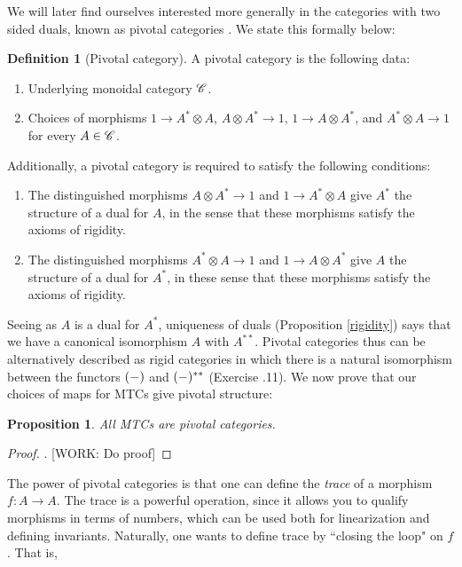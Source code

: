 \documentclass{article}
\newtheorem{proposition}{Proposition}[section]
\theoremstyle{definition}
\newtheorem*{definition}{Definition}
\numberwithin{figure}{section}
\begin{document}
We will later find ourselves interested more generally in the categories with two sided duals, known as pivotal categories \cite{selinger2011survey}. We state this formally below:

\begin{definition}[Pivotal category] A pivotal category is the following data:

\begin{enumerate}
\item Underlying monoidal category $\mathscr{C}$.
\item Choices of morphisms $1\to A^{*}\otimes A$, $A\otimes A^{*}\to 1$, $1\to A\otimes A^{*}$, and $A^{*}\otimes A\to 1$ for every $A\in \mathscr{C}$.
\end{enumerate}

Additionally, a pivotal category is required to satisfy the following conditions:

\begin{enumerate}
\item The distinguished morphisms $A\otimes A^{*}\to 1$ and $1\to A^{*}\otimes A$ give $A^{*}$ the structure of a dual for $A$, in the sense that these morphisms satisfy the axioms of rigidity.

\item The distinguished morphisms $A^{*}\otimes A\to 1$ and $1\to A\otimes A^{*}$ give $A$ the structure of a dual for $A^{*}$, in these sense that these morphisms satisfy the axioms of rigidity.
\end{enumerate}

\raggedleft\qedsymbol{}
\end{definition}

Seeing as $A$ is a dual for $A^{*}$, uniqueness of duals (Proposition \ref{rigidity}) says that we have a canonical isomorphism $A$ with $A^{**}$. Pivotal categories thus can be alternatively described as rigid categories in which there is a natural isomorphism between the functors $(\--)$ and $(\--)^{**}$ (Exercise \thesection.11). We now prove that our choices of maps for MTCs give pivotal structure:


\begin{proposition} All MTCs are pivotal categories.
\end{proposition}
\begin{proof}. [WORK: Do proof]
\end{proof}

The power of pivotal categories is that one can define the \textit{trace} of a morphism $f:A \to A$. The trace is a powerful operation, since it allows you to qualify morphisms in terms of numbers, which can be used both for linearization and defining invariants. Naturally, one wants to define trace by ``closing the loop" on $f$. That is,
\end{document}
